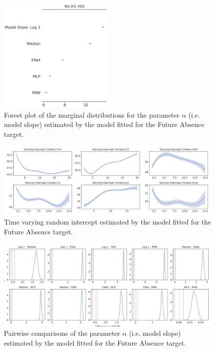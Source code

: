 \begin{figure}[ht]
\centering
\includegraphics[width=0.5\textwidth]{images/appendix_C/Future Absence_models_2.png}
\caption[\textbf{Future absence model fixed effect}]{Forest plot of the marginal distributions for the parameter $\alpha$ (i.e. model slope) estimated by the model fitted for the Future Absence target.}
\label{model_abs_2}
\end{figure}
\FloatBarrier

\begin{figure}[ht]
\centering
\includegraphics[width=\textwidth]{images/appendix_C/Future Absence_interc_2.png}
\caption[\textbf{Future absence time-varying random intercept}]{Time varying random intercept estimated by the model fitted for the Future Absence target.}
\label{interc_abs_2}
\end{figure}
\FloatBarrier

\begin{figure}[ht]
\centering
\includegraphics[width=\textwidth]{images/appendix_C/Future_Absence_comp_2.png}
\caption[\textbf{Future absence pairwise comparisons of model fixed effect}]{Pairwise comparisons of the parameter $\alpha$ (i.e. model slope) estimated by the model fitted for the Future Absence target.}
\label{comp_abs_2}
\end{figure}
\FloatBarrier

